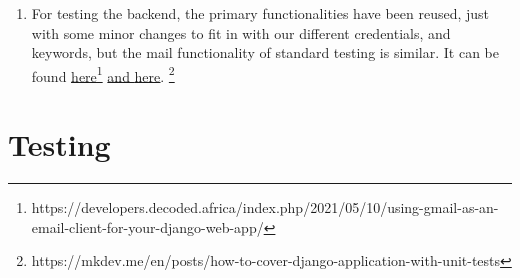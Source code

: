 \documentclass{article}
\begin{document}
\begin{itemize}
\begin{enumerate}
        \href{https://developers.decoded.africa/index.php/2021/05/10/using-gmail-as-an-email-client-for-your-django-web-app/}{\underline{here.}}.\footnote{https://developers.decoded.africa/index.php/2021/05/10/using-gmail-as-an-email-client-for-your-django-web-app/}
        \item For testing the backend, the primary functionalities have been reused, just with some minor changes to fit in with our different credentials, and keywords, but the mail functionality of standard testing is similar. It can be found
        \href{https://developers.decoded.africa/index.php/2021/05/10/using-gmail-as-an-email-client-for-your-django-web-app/}{\underline{here}}\footnote{https://developers.decoded.africa/index.php/2021/05/10/using-gmail-as-an-email-client-for-your-django-web-app/}
        \href{https://mkdev.me/en/posts/how-to-cover-django-application-with-unit-tests}{and \underline{here}}.
        \footnote{https://mkdev.me/en/posts/how-to-cover-django-application-with-unit-tests}
    \end{enumerate}
\end{itemize}

\section*{Testing}
\end{document}
